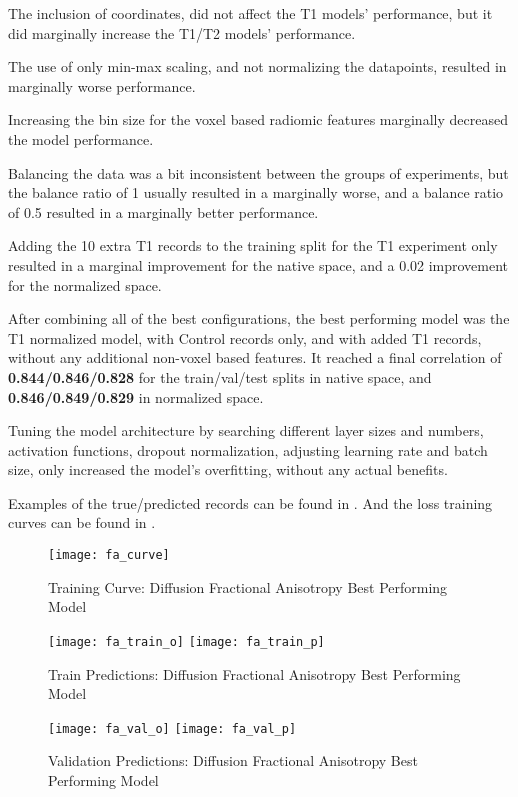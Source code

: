 The inclusion of coordinates, did not affect the T1 models' performance, but it did marginally increase the T1/T2 models' performance.\par
The use of only min-max scaling, and not normalizing the datapoints, resulted in marginally worse performance.\par
Increasing the bin size for the voxel based radiomic features marginally decreased the model performance.\par
Balancing the data was a bit inconsistent between the groups of experiments, but the balance ratio of 1 usually resulted in a marginally worse, and a balance ratio of 0.5 resulted in a marginally better performance.\par
Adding the 10 extra T1 records to the training split for the T1 experiment only resulted in a marginal improvement for the native space, and a 0.02 improvement for the normalized space.\par
After combining all of the best configurations, the best performing model was the T1 normalized model, with Control records only, and with added T1 records, without any additional non-voxel based features. It reached a final correlation of \textbf{0.844/0.846/0.828} for the train/val/test splits in native space, and \textbf{0.846/0.849/0.829} in normalized space.\par
Tuning the model architecture by searching different layer sizes and numbers, activation functions, dropout normalization, adjusting learning rate and batch size, only increased the model’s overfitting, without any actual benefits.\par
Examples of the true/predicted records can be found in  . And the loss training curves can be found in .

\begin{figure}[H]
\centering
\texttt{[image: fa\_curve]}
\caption{Training Curve: Diffusion Fractional Anisotropy Best Performing Model}
\label{fig:curve-fa}
\end{figure}

\begin{figure}[H]
\centering
\texttt{[image: fa\_train\_o]}
\texttt{[image: fa\_train\_p]}
\caption{Train Predictions: Diffusion Fractional Anisotropy Best Performing Model}
\label{fig:pred-tra-fa}
\end{figure}

\begin{figure}[H]
\centering
\texttt{[image: fa\_val\_o]}
\texttt{[image: fa\_val\_p]}
\caption{Validation Predictions: Diffusion Fractional Anisotropy Best Performing Model}
\label{fig:pred-val-fa}
\end{figure}

